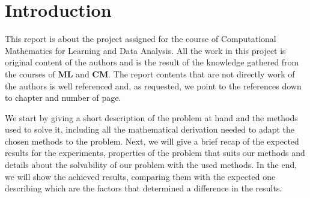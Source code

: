 \section{Introduction}
This report is about the project assigned for the course of Computational Mathematics for Learning and Data Analysis. All the work in this project is original content of the authors and is the result of the knowledge gathered from the courses of \textbf{ML} and \textbf{CM}. The report contents that are not directly work of the authors is well referenced and, as requested, we point to the references down to chapter and number of page.\newline

We start by giving a short description of the problem at hand and the methods used to solve it, including all the mathematical derivation needed to adapt the chosen methods to the problem. Next, we will give a brief recap of the expected results for the experiments, properties of the problem that suits our methods and details about the solvability of our problem with the used methods. In the end, we will show the achieved results, comparing them with the expected one describing which are the factors that determined a difference in the results.